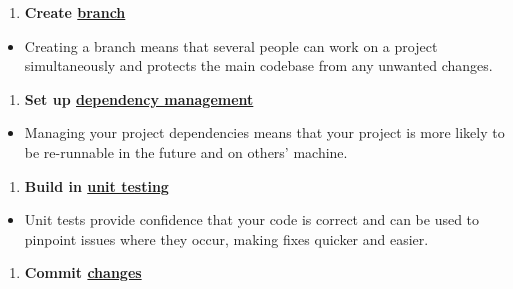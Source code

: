 \documentclass[]{book}
\providecommand{\tightlist}{%
  \setlength{\itemsep}{0pt}\setlength{\parskip}{0pt}}
\begin{document}
\begin{enumerate}
\def\labelenumi{\arabic{enumi}.}
\setcounter{enumi}{2}
\tightlist
\item
  \textbf{Create \protect\hyperlink{versioncontrol}{branch}}\\
\end{enumerate}

\begin{itemize}
\tightlist
\item
  Creating a branch means that several people can work on a project simultaneously and protects the main codebase from any unwanted changes.\\
\end{itemize}

\begin{enumerate}
\def\labelenumi{\arabic{enumi}.}
\setcounter{enumi}{3}
\tightlist
\item
  \textbf{Set up \protect\hyperlink{projdep}{dependency management}}\\
\end{enumerate}

\begin{itemize}
\tightlist
\item
  Managing your project dependencies means that your project is more likely to be re-runnable in the future and on others' machine.\\
\end{itemize}

\begin{enumerate}
\def\labelenumi{\arabic{enumi}.}
\setcounter{enumi}{4}
\tightlist
\item
  \textbf{Build in \protect\hyperlink{unittest}{unit testing}}\\
\end{enumerate}

\begin{itemize}
\tightlist
\item
  Unit tests provide confidence that your code is correct and can be used to pinpoint issues where they occur, making fixes quicker and easier.\\
\end{itemize}

\begin{enumerate}
\def\labelenumi{\arabic{enumi}.}
\setcounter{enumi}{5}
\tightlist
\item
  \textbf{Commit \protect\hyperlink{versioncontrol}{changes}}\\
\end{enumerate}
\end{document}
